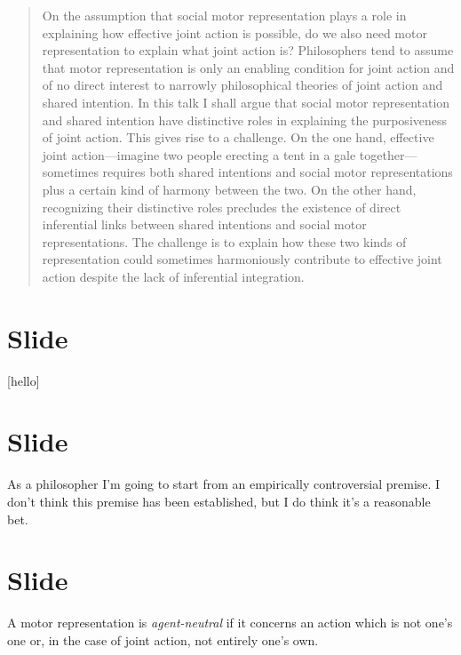 \documentclass[12pt,\papersize]{extarticle}
\begin{document}
\setlength\footnotesep{1em}


\maketitle
\title{}

\begin{abstract}
On the assumption that social motor representation plays a role in explaining how effective joint action is possible, do we also need motor representation to explain what joint action is?  Philosophers tend to assume that motor representation is only an enabling condition for joint action and of no direct interest to narrowly philosophical theories of joint action and shared intention.  In this talk I shall argue that social motor representation and shared intention  have distinctive roles in explaining the purposiveness of joint action.  This gives rise to a challenge.  On the one hand, effective joint action---imagine two people erecting a tent in a gale together---sometimes requires both shared intentions and social motor representations plus a certain kind of harmony between the two.  On the other hand, recognizing their distinctive roles precludes the existence of direct inferential links between shared intentions and social motor representations.  The challenge is to explain how these two kinds of representation could sometimes harmoniously contribute to effective joint action despite the lack of inferential integration.
\end{abstract}

\section{Slide}
[hello]

\section{Slide}
As a philosopher I’m going to start from an empirically controversial premise.
I don’t think this premise has been established, but I do think it’s a reasonable bet.


\section{Slide}
A motor representation is \emph{agent-neutral} if it concerns an action which is not one’s one or, in the case of joint action, not entirely one’s own.
\end{document}
